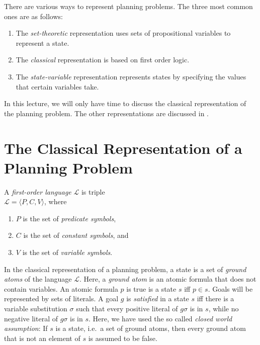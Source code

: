 There are various ways to represent planning problems.  The three most common ones are as follows:
\begin{enumerate}
\item The \emph{set-theoretic} representation uses sets of propositional variables to represent a
      state.
\item The \emph{classical} representation is based on first order logic.
\item The \emph{state-variable} representation represents states by specifying the values that
      certain variables take.
\end{enumerate}
In this lecture, we will only have time to discuss the classical representation of the planning
problem.  The other representations are discussed in \cite{ghallab:2004}.


\section{The Classical Representation of a Planning Problem}
A \emph{first-order language} $\mathcal{L}$ is triple
\\[0.2cm]
\hspace*{1.3cm}
$\mathcal{L} = \langle P, C, V \rangle$, \quad where
\begin{enumerate}
\item $P$ is the set of \emph{predicate symbols},
\item $C$ is the set of \emph{constant symbols}, and
\item $V$ is the set of \emph{variable symbols}.
\end{enumerate}

In the classical representation of a planning problem, a state is a set of \emph{ground atoms} of the
language $\mathcal{L}$.  Here, a \emph{ground atom} is an atomic formula that does not contain
variables.  An atomic formula $p$ is true is a state $s$ iff $p \in s$.  Goals will be represented
by sets of literals.  A goal $g$ is \emph{satisfied} in a state $s$ iff there is a variable
substitution $\sigma$ such that every positive literal of $g\sigma$ is in $s$, while no negative
literal of $g\sigma$ is in $s$.  Here, we have used the so called \emph{closed world assumption}:
If $s$ is a state, i.e.~a set of ground atoms, then every ground atom that is not an element of $s$
is assumed to be false.

